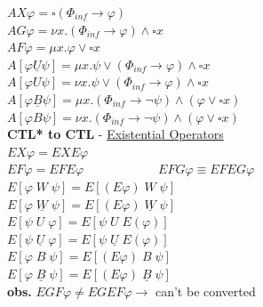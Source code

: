 \documentclass{article}
\begin{document}
\begin{multicols}{4}
$AX\varphi = \square (\Phi_{inf} \rightarrow \varphi)$ \\
$AG\varphi = \nu x.(\Phi_{inf} \rightarrow \varphi) \wedge \square x $ \\
$AF\varphi = \mu x.\varphi \vee \square x  $ \\
$A[ \varphi \underline{U} \psi] = \mu x. \psi \vee (\Phi_{inf} \rightarrow \varphi) \wedge \square x $ \\
$A[ \varphi U \psi] = \nu x.\psi \vee (\Phi_{inf} \rightarrow \varphi) \wedge \square x $ \\
$A[ \varphi \underline{B} \psi] = \mu x.(\Phi_{inf} \rightarrow \neg\psi) \wedge (\varphi \vee \square x) $ \\
$A[ \varphi B \psi] = \nu x.(\Phi_{inf} \rightarrow \neg\psi) \wedge (\varphi \vee \square x)$\\

\textbf{CTL* to CTL} - \underline{Existential Operators}\\
$EX\varphi = EXE \varphi$\\
$EF\varphi = EFE\varphi\qquad \qquad \qquad EFG\varphi \equiv EFEG\varphi$\\
$E[\varphi\; W \; \psi]=E[(E\varphi)\; W \;\psi]$\\
$E[\varphi\; \underline{W} \; \psi]=E[(E\varphi)\; \underline{W} \;\psi]$\\
$E[\psi\; U \; \varphi]=E[\psi \; U \;E(\varphi)]$\\
$E[\psi\; \underline{U} \; \varphi]=E[\psi \; \underline{U} \;E(\varphi)]$\\
$E[\varphi\; B \; \psi]=E[(E\varphi)\; B \;\psi]$\\
$E[\varphi\; \underline{B} \; \psi]=E[(E\varphi)\; \underline{B} \;\psi]$\\
\textbf{obs.} $EGF\varphi \neq EGEF\varphi \rightarrow$ can't be converted\\ 


\end{multicols}
\end{document}
